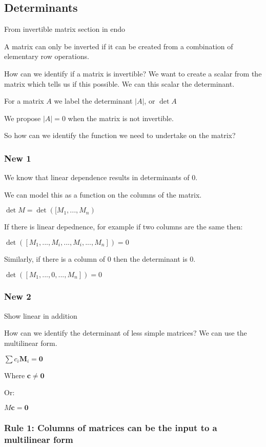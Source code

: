 
\subsection{Determinants}


From invertible matrix section in endo


A matrix can only be inverted if it can be created from a combination of elementary row operations.

How can we identify if a matrix is invertible? We want to create a scalar from the matrix which tells us if this possible. We can this scalar the determinant.

For a matrix \(A\) we label the determinant \(|A|\), or \(\det A\)

We propose \(|A|=0\) when the matrix is not invertible.

So how can we identify the function we need to undertake on the matrix?

\subsubsection{New 1}

We know that linear dependence results in determinants of \(0\).

We can model this as a function on the columns of the matrix.

\(\det M = \det ([M_1, ...,M_n)\)

If there is linear depednence, for example if two columns are the same then:

\(\det ([M_1,...,M_i,...,M_i,...,M_n])=0\)

Similarly, if there is a column of \(0\) then the determinant is \(0\).

\(\det ([M_1,...,0,...,M_n])=0\)
\subsubsection{New 2}

Show linear in addition

How can we identify the determinant of less simple matrices? We can use the multilinear form.

\(\sum c_i\mathbf M_i=\mathbf 0\)

Where \(\mathbf c \ne \mathbf 0\)

Or:

\(M\mathbf c=\mathbf 0\)
\subsubsection{Rule 1: Columns of matrices can be the input to a multilinear form}

